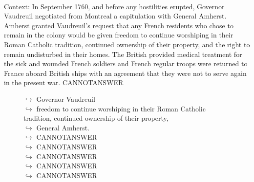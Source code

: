 \documentclass[11pt,a4paper, onecolumn]{article}
\begin{document}
\\ Context: In September 1760, and before any hostilities erupted, Governor Vaudreuil negotiated from Montreal a capitulation with General Amherst. Amherst granted Vaudreuil's request that any French residents who chose to remain in the colony would be given freedom to continue worshiping in their Roman Catholic tradition, continued ownership of their property, and the right to remain undisturbed in their homes. The British provided medical treatment for the sick and wounded French soldiers and French regular troops were returned to France aboard British ships with an agreement that they were not to serve again in the present war. CANNOTANSWER

\begin{figure}[t] \small \begin{tcolorbox}[boxsep=0pt,left=5pt,right=0pt,top=2pt,colback = yellow!5] \begin{dialogue}
 \small 
\colorbox{pink!25}{$\hookrightarrow$}
{ Governor Vaudreuil }
\\
\colorbox{pink!25}{$\hookrightarrow$}
{ freedom to continue worshiping in their Roman Catholic tradition, continued ownership of their property, }
\\
\colorbox{pink!25}{$\hookrightarrow$}
{ General Amherst. }
\\
\colorbox{pink!25}{$\hookrightarrow$}
{ CANNOTANSWER }
\\
\colorbox{pink!25}{$\hookrightarrow$}
{ CANNOTANSWER }
\\
\colorbox{pink!25}{$\hookrightarrow$}
{ CANNOTANSWER }
\\
\colorbox{pink!25}{$\hookrightarrow$}
{ CANNOTANSWER }
\\
\colorbox{pink!25}{$\hookrightarrow$}
{ CANNOTANSWER }
 \end{dialogue}\end{tcolorbox}\end{figure}
\end{document}
